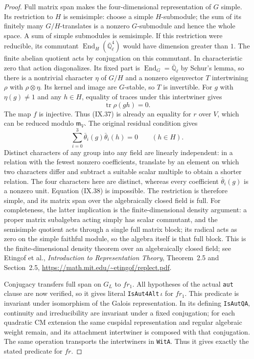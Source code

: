 \begin{proof}
Full matrix span makes the four-dimensional
representation of $G$ simple.  Its restriction to
$H$ is semisimple: choose a simple $H$-submodule;
the sum of its finitely many $G/H$-translates is
a nonzero $G$-submodule and hence the whole space.
A sum of simple submodules is semisimple.
If this restriction were reducible, its commutant
$\operatorname{End}_H(\overline{\mathbb Q}_\ell^4)$
would have dimension greater than $1$.
The finite abelian quotient acts by conjugation
on this commutant.  In characteristic zero that
action diagonalizes.  Its fixed part is
$\operatorname{End}_G=\overline{\mathbb Q}_\ell$
by Schur's lemma, so there is a nontrivial character
$\eta$ of $G/H$ and a nonzero eigenvector $T$
intertwining $\rho$ with $\rho\otimes\eta$.
Its kernel and image are $G$-stable, so $T$ is invertible.
For $g$ with $\eta(g)\ne1$ and any $h\in H$, equality
of traces under this intertwiner gives
\[
                        \operatorname{tr}\rho(gh)=0.
 \tag{IX.37}
\]
The map $f$ is injective.  Thus (IX.37) is already
an equality for $r$ over $V$, which can be reduced
modulo $\mathfrak m_V$.  The original residual
condition gives
\[
       \sum_{i=0}^3\bar\theta_i(g)\bar\theta_i(h)=0
                                  \qquad(h\in H).
 \tag{IX.38}
\]
Distinct characters of any group into any field are
linearly independent: in a relation with the fewest
nonzero coefficients, translate by an element on
which two characters differ and subtract a suitable
scalar multiple to obtain a shorter relation.
The four characters here are distinct, whereas
every coefficient $\bar\theta_i(g)$ is a nonzero
unit.  Equation (IX.38) is impossible.
The restriction is therefore simple, and its matrix
span over the algebraically closed field is full.
For completeness, the latter implication is the
finite-dimensional density argument: a proper
matrix subalgebra acting simply has scalar
commutant, and the semisimple quotient acts through
a single full matrix block; its radical acts as
zero on the simple faithful module, so the algebra
itself is that full block.
This is the finite-dimensional density theorem over
an algebraically closed field; see Etingof et al.,
\emph{Introduction to Representation Theory},
Theorem~2.5 and Section~2.5,
\url{https://math.mit.edu/~etingof/replect.pdf}.

Conjugacy transfers full span on $G_L$ to $fr_1$.
All hypotheses of the actual \texttt{aut} clause
are now verified, so it gives literal
\texttt{IsAut4Alt}$\,\iota$ for $fr_1$.
This predicate is invariant under isomorphism of
the Galois representation.  In its defining
\texttt{IsAutQA}, continuity and irreducibility
are invariant under a fixed conjugation; for each
quadratic CM extension the same cuspidal
representation and regular algebraic weight remain,
and its attachment intertwiner is composed with
that conjugation.  The same operation transports
the intertwiners in \texttt{WitA}.
Thus it gives exactly the stated predicate for $fr$.


\end{proof}
